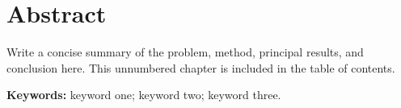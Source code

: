 \chapter*{Abstract}

Write a concise summary of the problem, method, principal results, and
conclusion here. This unnumbered chapter is included in the table of contents.

\textbf{Keywords:} keyword one; keyword two; keyword three.
